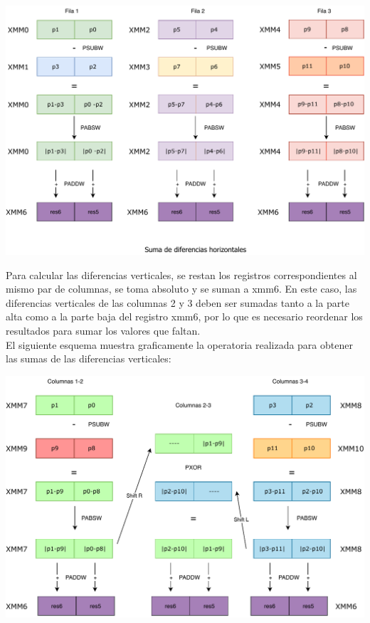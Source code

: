 \documentclass[a4paper]{article}
\begin{document}
\begin{itemize}
	\begin{center}
		\includegraphics[scale=0.6]{img/sumHorizontalColorBordes.pdf}
	\end{center}

	Para calcular las diferencias verticales, se restan los registros correspondientes al mismo par de columnas, se toma absoluto y se suman a xmm6. En este caso, las diferencias verticales de las columnas 2 y 3 deben ser sumadas tanto a la parte alta como a la parte baja del registro xmm6, por lo que es necesario reordenar los resultados para sumar los valores que faltan. \\
	El siguiente esquema muestra graficamente la operatoria realizada para obtener las sumas de las diferencias verticales:
	
	\begin{center}
		\includegraphics[scale=0.6]{img/sumVerticalesColorBordes.pdf}
	\end{center}
	   

\end{itemize}
\end{document}
